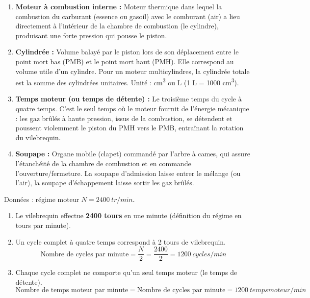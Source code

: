 \documentclass[11pt]{article}
\begin{document}
\begin{corrige}
\begin{enumerate}
\item \textbf{Moteur à combustion interne :} Moteur thermique dans lequel la combustion du carburant (essence ou gasoil) avec le comburant (air) a lieu directement à l'intérieur de la chambre de combustion (le cylindre), produisant une forte pression qui pousse le piston.
\item \textbf{Cylindrée :} Volume balayé par le piston lors de son déplacement entre le point mort bas (PMB) et le point mort haut (PMH). Elle correspond au volume utile d'un cylindre. Pour un moteur multicylindres, la cylindrée totale est la somme des cylindrées unitaires. Unité : \si{cm^3} ou \si{L} (1 L = 1000 \si{cm^3}).
\item \textbf{Temps moteur (ou temps de détente) :} Le troisième temps du cycle à quatre temps. C'est le seul temps où le moteur fournit de l'énergie mécanique : les gaz brûlés à haute pression, issus de la combustion, se détendent et poussent violemment le piston du PMH vers le PMB, entraînant la rotation du vilebrequin.
\item \textbf{Soupape :} Organe mobile (clapet) commandé par l'arbre à cames, qui assure l'étanchéité de la chambre de combustion et en commande l'ouverture/fermeture. La soupape d'admission laisse entrer le mélange (ou l'air), la soupape d'échappement laisse sortir les gaz brûlés.
\end{enumerate}
\end{corrige}

\begin{corrige}
Données : régime moteur $N = \SI{2400}{tr/min}$.
\begin{enumerate}
\item Le vilebrequin effectue \textbf{2400 tours} en une minute (définition du régime en tours par minute).
\item Un cycle complet à quatre temps correspond à 2 tours de vilebrequin.
      \[
      \text{Nombre de cycles par minute} = \frac{N}{2} = \frac{2400}{2} = \SI{1200}{cycles/min}
      \]
\item Chaque cycle complet ne comporte qu'un seul temps moteur (le temps de détente).
      \[
      \text{Nombre de temps moteur par minute} = \text{Nombre de cycles par minute} = \SI{1200}{temps moteur/min}
      \]
\end{enumerate}
\end{corrige}
\end{document}
